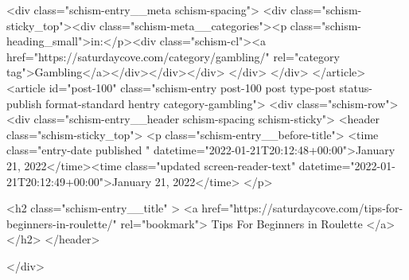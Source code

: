 {		<div class="schism-entry__meta schism-spacing">			<div class="schism-sticky_top"><div class="schism-meta__categories"><p class="schism-heading_small">in:</p><div class="schism-cl"><a href="https://saturdaycove.com/category/gambling/" rel="category tag">Gambling</a></div></div></div>		</div>
	</div>
</article>
<article id="post-100" class="schism-entry post-100 post type-post status-publish format-standard hentry category-gambling">
	<div class="schism-row">		<div class="schism-entry__header schism-spacing schism-sticky">			<header class="schism-sticky_top">				<p class="schism-entry__before-title">
					<time class="entry-date published " datetime="2022-01-21T20:12:48+00:00">January 21, 2022</time><time class="updated screen-reader-text" datetime="2022-01-21T20:12:49+00:00">January 21, 2022</time>				</p>

				<h2 class="schism-entry__title" >
					<a href="https://saturdaycove.com/tips-for-beginners-in-roulette/" rel="bookmark">
						Tips For Beginners in Roulette					</a>
				</h2>
			</header>

					</div>

}
